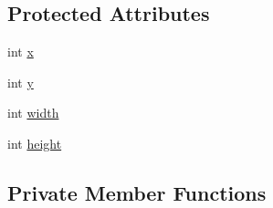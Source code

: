 \subsection*{Protected Attributes}
\begin{DoxyCompactItemize}
\item 
int \hyperlink{classui_1_1_my_button_a6150e0515f7202e2fb518f7206ed97dc}{x}
\item 
int \hyperlink{classui_1_1_my_button_a0a2f84ed7838f07779ae24c5a9086d33}{y}
\item 
int \hyperlink{classui_1_1_my_button_a2474a5474cbff19523a51eb1de01cda4}{width}
\item 
int \hyperlink{classui_1_1_my_button_ad12fc34ce789bce6c8a05d8a17138534}{height}
\end{DoxyCompactItemize}
\subsection*{Private Member Functions}
